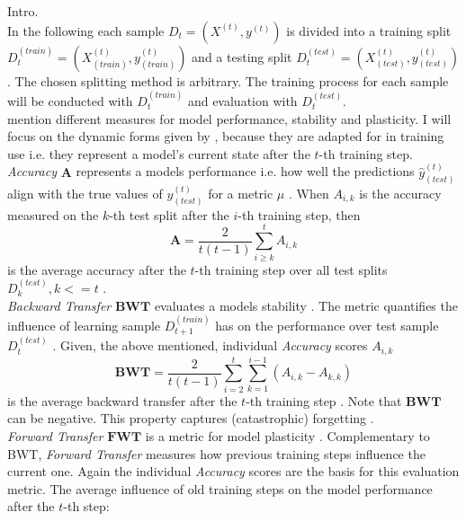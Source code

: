 Intro.\\
In the following each sample $D_t = (X^{(t)}, y^{(t)})$ is divided into a training split $D_t^{(train)} = (X^{(t)}_{(train)}, y^{(t)}_{(train)})$ and a testing split $D_t^{(test)} = (X^{(t)}_{(test)}, y^{(t)}_{(test)})$. The chosen splitting method is arbitrary. The training process for each sample will be conducted with $D_t^{(train)}$ and evaluation with $D_t^{(test)}$.\\
\cite{LW} mention different measures for model performance, stability and plasticity. I will focus on the dynamic forms given by \cite{díazrodríguez2018dontforgetforgettingnew}, because they are adapted for in training use i.e. they represent a model's current state after the $t$-th training step.\\
\textit{Accuracy} $\mathbf{A}$ represents a models performance i.e. how well the predictions $\hat{y}^{(t)}_{(test)}$ align with the true values of $y^{(t)}_{(test)}$ for a metric $\mu$ . When $A_{i,k}$ is the accuracy measured on the $k$-th test split after the $i$-th training step, then
\begin{equation}
	\mathbf{A} = \frac{2}{t(t-1)}\sum_{i \geq k }^{t} A_{i,k}
\end{equation}
is the average accuracy after the $t$-th training step over all test splits $D_k^{(test)}, k <= t$ \cite{díazrodríguez2018dontforgetforgettingnew}.\\
\textit{Backward Transfer} $\mathbf{BWT}$ evaluates a models stability \cite{LW}. The metric quantifies the influence of learning sample $D_{t+1}^{(train)}$ has on the performance over test sample $D_t^{(test)}$ \cite{lopezpaz2022gradientepisodicmemorycontinual}. Given, the above mentioned, individual \textit{Accuracy} scores $A_{i,k}$
\begin{equation}
	\mathbf{BWT} = \frac{2}{t(t-1)} \sum_{i=2}^{t}\sum_{k=1}^{i-1}(A_{i,k}-A_{k,k})
\end{equation}
is the average backward transfer after the $t$-th training step \cite{díazrodríguez2018dontforgetforgettingnew}. Note that $\mathbf{BWT}$ can be negative. This property captures (catastrophic) forgetting \cite{LW}.\\
\textit{Forward Transfer} $\mathbf{FWT}$ is a metric for model plasticity \cite{LW}. Complementary to BWT, \textit{Forward Transfer} measures how previous training steps influence the current one. Again the individual \textit{Accuracy} scores are the basis for this evaluation metric. The average influence of old training steps on the model performance after the $t$-th step:
